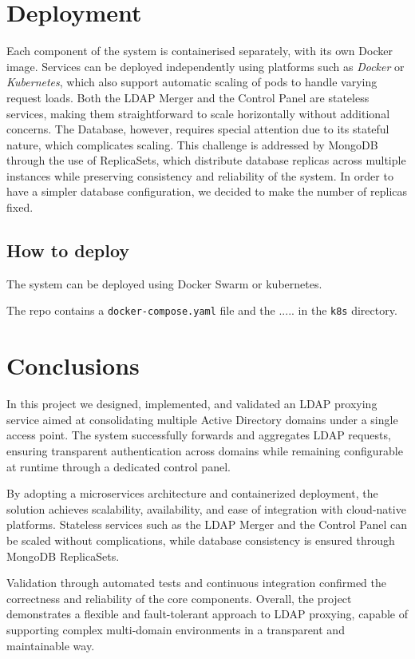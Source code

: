 \documentclass{scrartcl}
\begin{document}
\section{Deployment}

\par Each component of the system is containerised separately, with its own Docker image. Services can be deployed independently using platforms such as \textit{Docker} or \textit{Kubernetes}, which also support automatic scaling of pods to handle varying request loads. Both the LDAP Merger and the Control Panel are stateless services, making them straightforward to scale horizontally without additional concerns. The Database, however, requires special attention due to its stateful nature, which complicates scaling. This challenge is addressed by MongoDB through the use of ReplicaSets, which distribute database replicas across multiple instances while preserving consistency and reliability of the system. In order to have a simpler database configuration, we decided to make the number of replicas fixed.

\subsection{How to deploy}

\par The system can be deployed using Docker Swarm or kubernetes.
\par The repo contains a \texttt{docker-compose.yaml} file and the ..... in the \texttt{k8s} directory.

\section{Conclusions}

\par In this project we designed, implemented, and validated an LDAP proxying service aimed at consolidating multiple Active Directory domains under a single access point. The system successfully forwards and aggregates LDAP requests, ensuring transparent authentication across domains while remaining configurable at runtime through a dedicated control panel.
\par By adopting a microservices architecture and containerized deployment, the solution achieves scalability, availability, and ease of integration with cloud-native platforms. Stateless services such as the LDAP Merger and the Control Panel can be scaled without complications, while database consistency is ensured through MongoDB ReplicaSets.
\par Validation through automated tests and continuous integration confirmed the correctness and reliability of the core components. Overall, the project demonstrates a flexible and fault-tolerant approach to LDAP proxying, capable of supporting complex multi-domain environments in a transparent and maintainable way.

\nocite{*} %
% 
% 

\printbibliography
\end{document}
